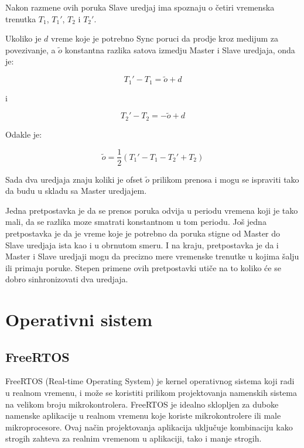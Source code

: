 \documentclass[a4paper,12pt, master]{etf}
\begin{document}
	Nakon razmene ovih poruka Slave uredjaj ima spoznaju o \v{c}etiri vremenska
	trenutka $T_1$,	$T_1'$,	$T_2$ i $T_2'$.

	Ukoliko je $d$ vreme koje je potrebno Sync poruci da prodje kroz medijum za
	povezivanje, a $\tilde{o}$ konstantna razlika satova izmedju Master i Slave
	uredjaja, onda je:

	\begin{equation}
		T_1' - T_1 = \tilde{o} + d
	\end{equation}

	i

	\begin{equation}
			T_2' - T_2 = -\tilde{o} + d
	\end{equation}

	Odakle je:

	\begin{equation}
		\tilde{o} = \frac{1}{2} (T_1' - T_1 - T_2' + T_2)
	\end{equation}

	Sada dva uredjaja znaju koliki je ofset $\tilde{o}$ prilikom prenosa i mogu
	se ispraviti tako da budu u skladu sa Master uredjajem.

	Jedna pretpostavka je da se prenos poruka odvija u periodu vremena koji je
	tako mali, da se razlika moze smatrati konstantnom u tom periodu. Jo\v{s}
	jedna pretpostavka je da je vreme koje je potrebno da poruka stigne od
	Master do Slave uredjaja ista kao i u obrnutom smeru. I na kraju,
	pretpostavka je da i Master i Slave uredjaji mogu da precizno mere
	vremenske trenutke u kojima \v{s}alju ili primaju poruke. Stepen primene
	ovih pretpostavki uti\v{c}e na to koliko \'{c}e se dobro sinhronizovati dva
	uredjaja.

	\newpage

	\chapter{Operativni sistem}

	\section{FreeRTOS}

	FreeRTOS (Real-time Operating System) je kernel operativnog sistema koji
	radi u realnom vremenu, i mo\v{z}e se koristiti prilikom projektovanja
    namenskih sistema na velikom broju mikrokontrolera. FreeRTOS je idealno
    sklopljen za duboke namenske aplikacije u realnom vremenu koje koriste
    mikrokontrolere ili male mikroprocesore. Ovaj na\v{c}in projektovanja
    aplikacija uklju\v{c}uje kombinaciju kako strogih zahteva za realnim
    vremenom u aplikaciji, tako i manje strogih.
\end{document}
